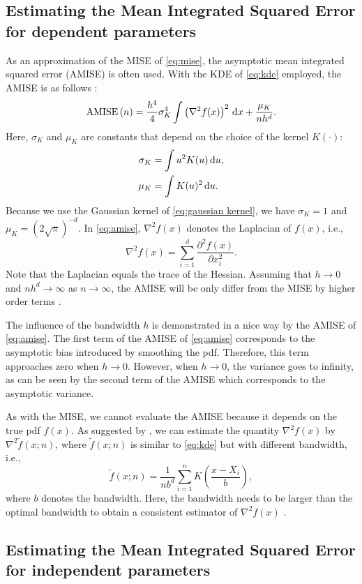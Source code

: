 \subsection{Estimating the Mean Integrated Squared Error for dependent parameters}
\label{sec:mise dependent}

As an approximation of the MISE of \cref{eq:mise}, the asymptotic mean integrated squared error (AMISE) is often used. With the KDE of \cref{eq:kde} employed, the AMISE is as follows \cite{marron1992exact}:
\begin{equation}
	\label{eq:amise}
	\textup{AMISE} \left( n \right) = \frac{h^4}{4} \sigma_K^4 \int \left( \nabla^2 f(x) \right)^2 \mathrm{\,d} x + \frac{\mu_K}{nh^d}.
\end{equation}
Here, $\sigma_K$ and $\mu_K$ are constants that depend on the choice of the kernel $K(\cdot)$:
\begin{align}
	\sigma_K &= \int u^2 K(u) \mathrm{\,d} u, \\
	\mu_K &= \int K(u)^2 \mathrm{\,d} u.
\end{align}
Because we use the Gaussian kernel of \cref{eq:gaussian kernel}, we have $\sigma_K=1$ and $\mu_K=(2\sqrt{\pi})^{-d}$. In \cref{eq:amise}, $\nabla^2 f(x)$ denotes the Laplacian of $f(x)$, i.e., 
\begin{equation}
	\nabla^2 f(x) = \sum_{i=1}^d \frac{\partial^2 f(x)}{\partial x_i^2}.
\end{equation}
Note that the Laplacian equals the trace of the Hessian. Assuming that $h \rightarrow 0$ and $nh^d \rightarrow \infty$ as $n \rightarrow \infty$, the AMISE will be only differ from the MISE by higher order terms \cite{silverman1986density}.

The influence of the bandwidth $h$ is demonstrated in a nice way by the AMISE of \cref{eq:amise}. The first term of the AMISE of \cref{eq:amise} corresponds to the asymptotic bias introduced by smoothing the pdf. Therefore, this term approaches zero when $h \rightarrow 0$. However, when $h \rightarrow 0$, the variance goes to infinity, as can be seen by the second term of the AMISE which corresponds to the asymptotic variance. 

As with the MISE, we cannot evaluate the AMISE because it depends on the true pdf $f(x)$. As suggested by \cite{chen2017tutorial}, we can estimate the quantity $\nabla^2 f(x)$ by $\nabla^2 \tilde{f}(x;n)$, where $\tilde{f}(x;n)$ is similar to \cref{eq:kde} but with different bandwidth, i.e., 
\begin{equation}
	\tilde{f}(x;n) = \frac{1}{nb^d} \sum_{i=1}^n K\left(\frac{x - X_i}{b}\right),
\end{equation}
where $b$ denotes the bandwidth. Here, the bandwidth needs to be larger than the optimal bandwidth to obtain a consistent estimator of $\nabla^2 f(x)$ \cite{chen2017tutorial}.

\subsection{Estimating the Mean Integrated Squared Error for independent parameters}
\label{sec:mise independent}

